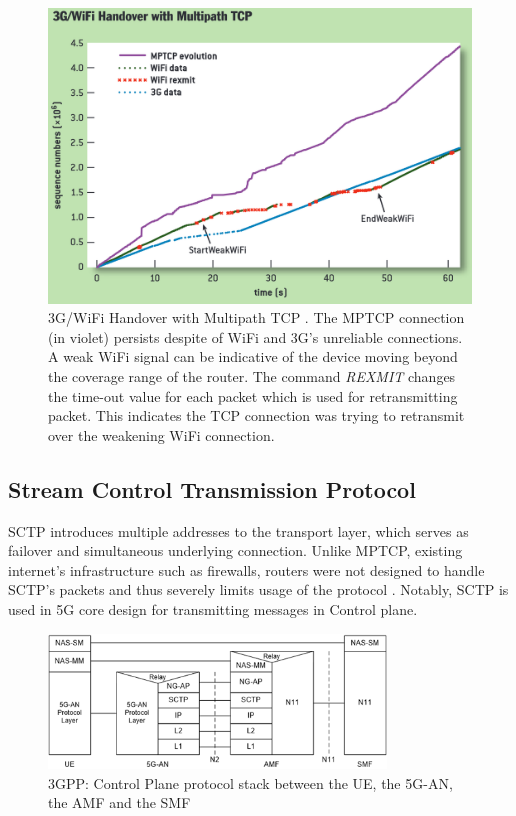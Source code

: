 \begin{figure}[H]
	\centering
	\includegraphics[width=1.0\textwidth]{resources/images/3G_WiFi_Handover_with_Multipath_TCP.PNG}
	\caption{3G/WiFi Handover with Multipath TCP \cite{paasch_multipath_2014}. The MPTCP connection (in violet) persists despite of WiFi and 3G's unreliable connections. A weak WiFi signal can be indicative of the device moving beyond the coverage range of the router. The command \textit{REXMIT} changes the time-out value for each packet which is used for retransmitting packet. This indicates the TCP connection was trying to retransmit over the weakening WiFi connection.}
    \label{fig:related_work:3G_WiFi_Handover_with_Multipath_TCP}
\end{figure}

\subsection{Stream Control Transmission Protocol}\label{sec:related_work:mp_connection:SCTP}
\ac{SCTP} introduces multiple addresses to the transport layer, which serves as failover and simultaneous underlying connection.
Unlike \ac{MPTCP}, existing internet's infrastructure such as firewalls, routers were not designed to handle \ac{SCTP}'s packets and thus severely limits usage of the protocol \cite{paasch_multipath_2014}. 
Notably, \ac{SCTP} is used in 5G core design for transmitting messages in Control plane.

\begin{figure}[H]
	\centering
	\includegraphics[width=0.8\textwidth]{resources/images/3gpp_5g_part_of_control_plane_protocol.png}
	\caption{3GPP: Control Plane protocol stack between the UE, the 5G-AN, the AMF and the SMF \cite{3gpp_5g_system_overview}}
    \label{fig:related_work:3gpp_5g_part_of_control_plane_protocol}
\end{figure}


